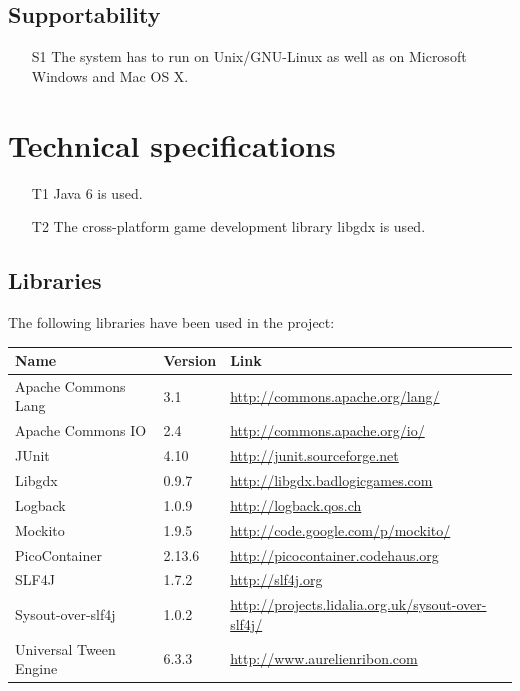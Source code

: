 \documentclass[fontsize=12pt,
               paper=a4,
               twoside=false,
               parskip=half,
               ]{scrartcl}
\begin{document}
\subsection{Supportability}
\begin{itemize}
	\item[S1] The system has to run on Unix/GNU-Linux as well as on Microsoft Windows and Mac OS X.	
\end{itemize}

\section{Technical specifications}
\begin{itemize}
	\item[T1] Java 6 is used.
	\item[T2] The cross-platform game development library libgdx is used. 
\end{itemize}

\subsection{Libraries}
The following libraries have been used in the project:

\begin{tabular}{| l | l | l |}
	\hline
	\textbf{Name} & \textbf{Version} & \textbf{Link} \\ \hline
	Apache Commons Lang & 3.1 & \url{http://commons.apache.org/lang/} \\ \hline
	Apache Commons IO & 2.4 & \url{http://commons.apache.org/io/} \\ \hline
	JUnit & 4.10 & \url{http://junit.sourceforge.net} \\ \hline
	Libgdx & 0.9.7 & \url{http://libgdx.badlogicgames.com} \\ \hline
	Logback & 1.0.9 & \url{http://logback.qos.ch} \\ \hline
	Mockito & 1.9.5 & \url{http://code.google.com/p/mockito/} \\ \hline
	PicoContainer & 2.13.6 & \url{http://picocontainer.codehaus.org} \\ \hline
	SLF4J & 1.7.2 & \url{http://slf4j.org} \\ \hline
	Sysout-over-slf4j & 1.0.2 & \url{http://projects.lidalia.org.uk/sysout-over-slf4j/} \\ \hline
	Universal Tween Engine & 6.3.3 & \url{http://www.aurelienribon.com} \\ \hline
\end{tabular}
\end{document}
